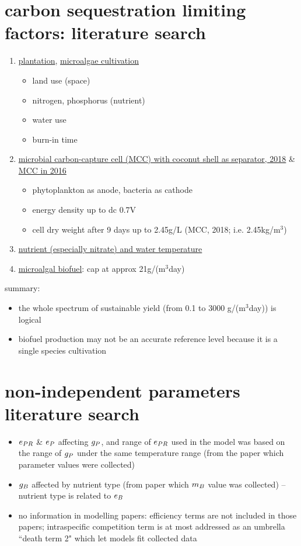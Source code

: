 \documentclass[../thesis.tex]{subfiles} %
\begin{document}
\section{carbon sequestration limiting factors: literature search}
\begin{enumerate}
    \item \href{https://doi.org/10.1007/s10584-012-0682-3}{plantation}, \href{https://doi.org/10.1007/s11120-011-9638-0}{microalgae cultivation}
    \begin{itemize}
        \item land use (space)
        \item nitrogen, phosphorus (nutrient)
        \item water use
        \item burn-in time
    \end{itemize}
    \item \href{https://doi.org/10.1016/j.bej.2018.02.014}{microbial carbon-capture cell (MCC) with coconut shell as separator, 2018} \& \href{https://doi.org/10.1016/j.biortech.2011.12.067}{MCC in 2016}
    \begin{itemize}
        \item phytoplankton as anode, bacteria as cathode
        \item energy density up to dc 0.7V
        \item cell dry weight after 9 days up to 2.45g/L (MCC, 2018; i.e. 2.45kg/m$^3$)
    \end{itemize}
    \item \href{http://dx.doi.org/10.3923/jfas.2011.130.140}{nutrient (especially nitrate) and water temperature}
    \item \href{https://doi.org/10.1007/s10811-017-1214-3}{microalgal biofuel}: cap at approx 21g/(m$^3$day)
\end{enumerate}
summary:
\begin{itemize}
    \item the whole spectrum of sustainable yield (from 0.1 to 3000 g/(m$^3$day)) is logical
    \item biofuel production may not be an accurate reference level because it is a single species cultivation
\end{itemize}

\section{non-independent parameters literature search}
\begin{itemize}
    \item $e_{PR}$ \& $e_P$ affecting $g_P$, and range of $e_{PR}$ used in the model was based on the range of $g_P$ under the same temperature range (from the paper which parameter values were collected)
    \item $g_B$ affected by nutrient type (from paper which $m_B$ value was collected) -- nutrient type is related to $e_B$
    \item no information in modelling papers: efficiency terms are not included in those papers; intraspecific competition term is at most addressed as an umbrella ``death term 2" which let models fit collected data
\end{itemize}
\end{document}
